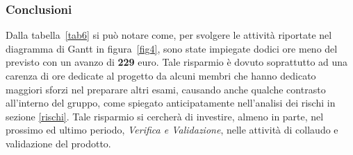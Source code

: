 \subsubsection{Conclusioni}
Dalla tabella~\ref{tab6} si può notare come, per svolgere le attività riportate nel diagramma di \gls{Gantt} in figura~\ref{fig4}, sono state impiegate dodici ore meno del previsto con un avanzo di \textbf{229} euro. Tale risparmio è dovuto soprattutto ad una carenza di ore dedicate al progetto da alcuni membri che hanno dedicato maggiori sforzi nel preparare altri esami, causando anche qualche contrasto all'interno del gruppo, come spiegato anticipatamente nell'analisi dei rischi in sezione \ref{rischi}. Tale risparmio si cercherà di investire, almeno in parte, nel prossimo ed ultimo periodo, \textit{Verifica e Validazione}, nelle attività di collaudo e validazione del prodotto. 